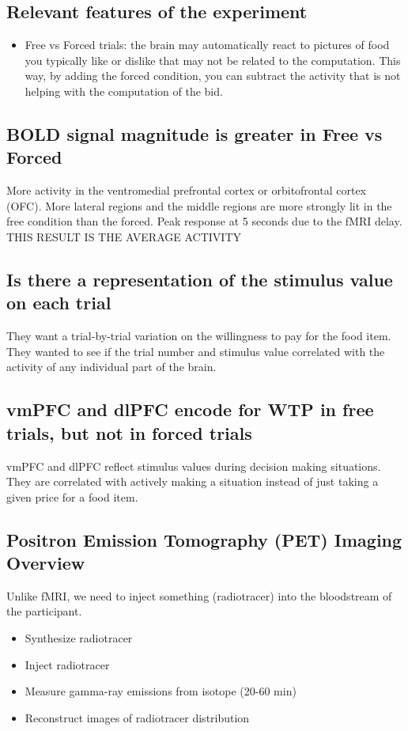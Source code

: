 \subsection{Relevant features of the experiment}
\begin{itemize}
    \item Free vs Forced trials: the brain may automatically react to pictures of food you typically like or dislike that may not be related to the computation. This way, by adding the forced condition, you can subtract the activity that is not helping with the computation of the bid.
\end{itemize}
\subsection{BOLD signal magnitude is greater in Free vs Forced}
More activity in the ventromedial prefrontal cortex or orbitofrontal cortex (OFC). More lateral regions and the middle regions are more strongly lit in the free condition than the forced. Peak response at 5 seconds due to the fMRI delay. THIS RESULT IS THE AVERAGE ACTIVITY

\subsection{Is there a representation of the stimulus value on each trial}
They want a trial-by-trial variation on the willingness to pay for the food item.
They wanted to see if the trial number and stimulus value correlated with the activity of any individual part of the brain.

\subsection{vmPFC and dlPFC encode for WTP in free trials, but not in forced trials}
vmPFC and dlPFC reflect stimulus values during decision making situations. They are correlated with actively making a situation instead of just taking a given price for a food item. 

\subsection{Positron Emission Tomography (PET) Imaging Overview}
Unlike fMRI, we need to inject something (radiotracer) into the bloodstream of the participant.
\begin{itemize}
    \item Synthesize radiotracer
    \item Inject radiotracer
    \item Measure gamma-ray emissions from isotope (20-60 min)
    \item Reconstruct images of radiotracer distribution
\end{itemize}
